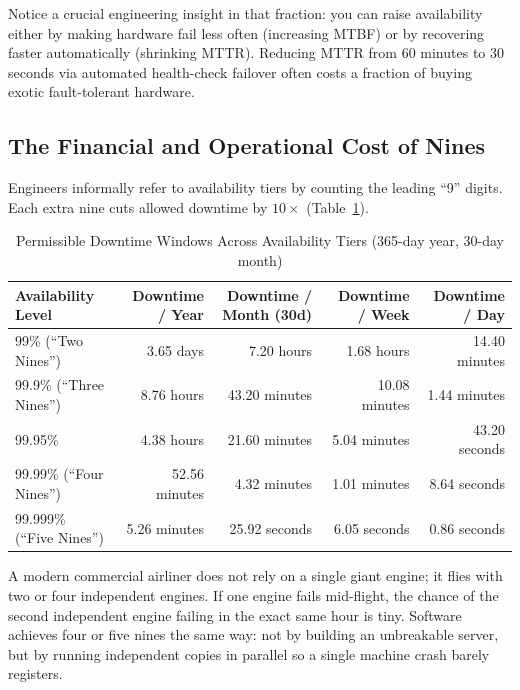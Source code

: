 Notice a crucial engineering insight in that fraction: you can raise availability either by making hardware fail less often (increasing MTBF) or by recovering faster automatically (shrinking MTTR). Reducing MTTR from 60 minutes to 30 seconds via automated health-check failover often costs a fraction of buying exotic fault-tolerant hardware.

\subsection{The Financial and Operational Cost of Nines}

Engineers informally refer to availability tiers by counting the leading ``9'' digits. Each extra nine cuts allowed downtime by $10\times$ (Table~\ref{tab:v5-ch01-availability-nines}).

\begin{table}[htbp]
\centering\small
\begin{tabular}{lrrrr}
\toprule
\textbf{Availability Level} & \textbf{Downtime / Year} & \textbf{Downtime / Month (30d)} & \textbf{Downtime / Week} & \textbf{Downtime / Day} \\
\midrule
99\% (``Two Nines'') & 3.65 days & 7.20 hours & 1.68 hours & 14.40 minutes \\
99.9\% (``Three Nines'') & 8.76 hours & 43.20 minutes & 10.08 minutes & 1.44 minutes \\
99.95\% & 4.38 hours & 21.60 minutes & 5.04 minutes & 43.20 seconds \\
99.99\% (``Four Nines'') & 52.56 minutes & 4.32 minutes & 1.01 minutes & 8.64 seconds \\
99.999\% (``Five Nines'') & 5.26 minutes & 25.92 seconds & 6.05 seconds & 0.86 seconds \\
\bottomrule
\end{tabular}
\caption{Permissible Downtime Windows Across Availability Tiers (365-day year, 30-day month)}
\label{tab:v5-ch01-availability-nines}
\end{table}

\begin{intuitionbox}
A modern commercial airliner does not rely on a single giant engine; it flies with two or four independent engines. If one engine fails mid-flight, the chance of the second independent engine failing in the exact same hour is tiny. Software achieves four or five nines the same way: not by building an unbreakable server, but by running independent copies in parallel so a single machine crash barely registers.
\end{intuitionbox}

